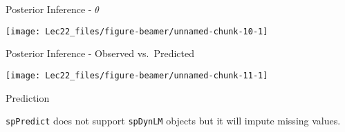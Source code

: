 \documentclass[11pt,ignorenonframetext,]{beamer}
\newenvironment{Shaded}{}{}
\newcommand{\DataTypeTok}[1]{\textcolor[rgb]{0.56,0.13,0.00}{#1}}
\newcommand{\DecValTok}[1]{\textcolor[rgb]{0.25,0.63,0.44}{#1}}
\newcommand{\KeywordTok}[1]{\textcolor[rgb]{0.00,0.44,0.13}{\textbf{#1}}}
\newcommand{\NormalTok}[1]{#1}
\newcommand{\OperatorTok}[1]{\textcolor[rgb]{0.40,0.40,0.40}{#1}}
\newcommand{\StringTok}[1]{\textcolor[rgb]{0.25,0.44,0.63}{#1}}
\let\oldShaded\Shaded
\let\endoldShaded\endShaded
\renewenvironment{Shaded}{\footnotesize\begin{spacing}{0.9}\oldShaded}{\endoldShaded\end{spacing}}
\begin{document}
\begin{frame}{Posterior Inference - \(\theta\)}
\protect\hypertarget{posterior-inference---theta}{}

\vspace{4mm}

\begin{center}\texttt{[image: Lec22\_files/figure-beamer/unnamed-chunk-10-1]} \end{center}

\end{frame}

\begin{frame}{Posterior Inference - Observed vs.~Predicted}
\protect\hypertarget{posterior-inference---observed-vs.predicted}{}

\vspace{4mm}

\begin{center}\texttt{[image: Lec22\_files/figure-beamer/unnamed-chunk-11-1]} \end{center}

\end{frame}

\begin{frame}[fragile]{Prediction}
\protect\hypertarget{prediction}{}

\texttt{spPredict} does not support \texttt{spDynLM} objects but it will
impute missing values.

\begin{Shaded}
\end{Shaded}

\end{frame}
\end{document}
